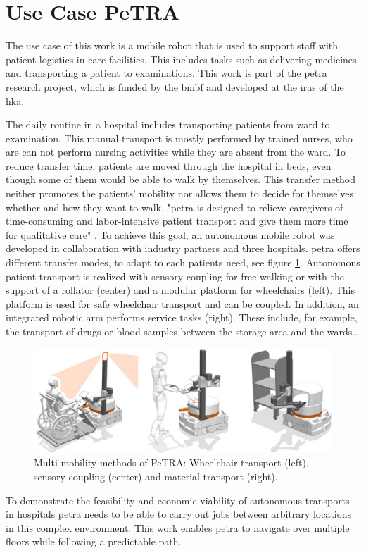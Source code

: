 \section{Use Case PeTRA}
\label{sec:use_case}
The use case of this work is a mobile robot that is used to support staff with patient logistics in care facilities. This includes tasks such as delivering medicines and transporting a patient to examinations. This work is part of the \gls{petra} research project, which is funded by the \gls{bmbf} \cite{bmbf-internetredaktion_bekanntmachung_2018} and developed at the \gls{iras} of the \gls{hka}.

The daily routine in a hospital includes transporting patients from ward to examination. This manual transport is mostly performed by trained nurses, who are can not perform nursing activities while they are absent from the ward. To reduce transfer time, patients are moved through the hospital in beds, even though some of them would be able to walk by themselves. This transfer method neither promotes the patients' mobility nor allows them to decide for themselves whether and how they want to walk. "\Gls{petra} is designed to relieve caregivers of time-consuming and labor-intensive patient transport and give them more time for qualitative care" \cite{petra-konsortium_personen-transfer_2022}. To achieve this goal, an autonomous mobile robot was developed in collaboration with industry partners and three hospitals. \Gls{petra} offers different transfer modes, to adapt to each patients need, see figure  \ref{fig:multi_mobility_methods}. Autonomous patient transport is realized with sensory coupling for free walking or with the support of a rollator (center) and a modular platform for wheelchairs (left). This platform is used for safe wheelchair transport and can be coupled. In addition, an integrated robotic arm performs service tasks (right). These include, for example, the transport of drugs or blood samples between the storage area and the wards..

\begin{figure}[h]
\includegraphics[width=\textwidth]{figures/20_state_of_the_art/PeTRA_transport_modes.jpg}
\caption[]{Multi-mobility methods of PeTRA: Wheelchair transport (left), sensory coupling (center) and material transport (right).}
\centering
\label{fig:multi_mobility_methods}
\end{figure}
To demonstrate the feasibility and economic viability of autonomous transports in hospitals \gls{petra} needs to be able to carry out jobs between arbitrary locations in this complex environment. This work enables \gls{petra} to navigate over multiple floors while following a predictable path.


